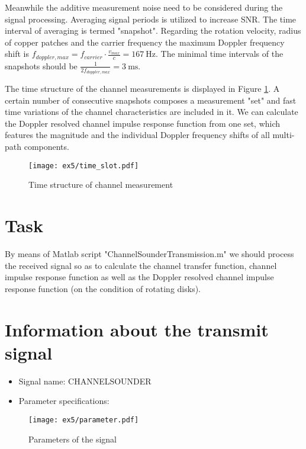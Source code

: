 Meanwhile the additive measurement noise need to be considered during the signal processing. Averaging signal periods is utilized to increase SNR. The time interval of averaging is termed "snapshot". Regarding the rotation velocity, radius of copper patches and the carrier frequency the maximum Doppler frequency shift is $f_{doppler,max} = f_{carrier}\cdot \frac{v_{max}}{c}=\SI{167}{\hertz}$. The minimal time intervals of the snapshots should be $\frac{1}{2 f_{doppler,max}}=\SI{3}{\milli \second}$.

The time structure of the channel measurements is displayed in Figure \ref{fig:ex5:time_slot}. A certain number of consecutive snapshots composes a measurement "set" and fast time variations of the channel characteristics are included in it. We can calculate the Doppler resolved channel impulse response function from one set, which features the magnitude and the individual Doppler frequency shifts of all multi-path components.

\begin{figure}[H]
	\begin{center}
		\texttt{[image: ex5/time\_slot.pdf]}
		\caption{Time structure of channel measurement \cite{e5}}
		\label{fig:ex5:time_slot}
	\end{center}
\end{figure}

\section{Task}
By means of Matlab script "ChannelSounderTransmission.m" we should process the received signal so as to calculate the channel transfer function, channel impulse response function as well as the Doppler resolved channel impulse response function (on the condition of  rotating disks).
\section{Information about the transmit signal}
\begin{itemize}
	\item Signal name: CHANNELSOUNDER
	\item Parameter specifications: 
\end{itemize}

\begin{figure}[H]
	\begin{center}
		\texttt{[image: ex5/parameter.pdf]}
		\caption{Parameters of the signal \cite{e5}}
		\label{fig:ex5:parameter}
	\end{center}
\end{figure}



